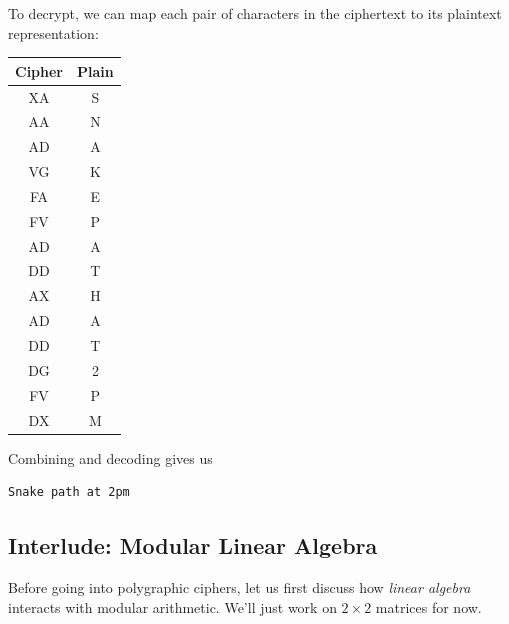 \documentclass[letterpaper]{article}
\begin{document}
\begin{mdframed}
\begin{enumerate}[(a)]
        \begin{mdframed}
            To decrypt, we can map each pair of characters in the ciphertext to its plaintext representation:
            \begin{center}
                \begin{tabular}{c|c}
                    \textbf{Cipher} & \textbf{Plain} \\ 
                    \hline 
                    XA              & S \\
                    AA              & N \\
                    AD              & A \\
                    VG              & K \\
                    FA              & E \\
                    FV              & P \\
                    AD              & A \\
                    DD              & T \\
                    AX              & H \\
                    AD              & A \\
                    DD              & T \\
                    DG              & 2 \\
                    FV              & P \\
                    DX              & M 
                \end{tabular} 
            \end{center}
            Combining and decoding gives us 
            \begin{mdframed}
                \begin{verbatim}
Snake path at 2pm\end{verbatim}
            \end{mdframed}
        \end{mdframed}
    \end{enumerate}
\end{mdframed}


\subsection{Interlude: Modular Linear Algebra}
Before going into polygraphic ciphers, let us first discuss how \emph{linear algebra} interacts with modular arithmetic. We'll just work on $2 \times 2$ matrices for now.
\end{document}

